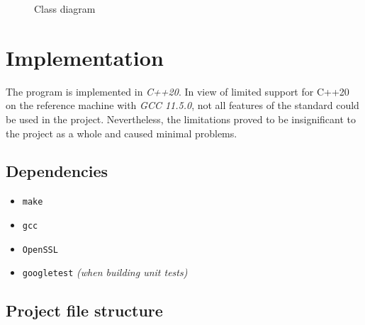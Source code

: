 \documentclass[a4]{report}
\begin{document}
\begin{figure}[t]
  \centering
  \caption{Class diagram}
  \label{class}
\end{figure}


\chapter{Implementation}

The program is implemented in \textit{C++20}. In view of limited support for C++20 on the reference machine with \textit{GCC 11.5.0}, not all features of the standard could be used in the project. Nevertheless, the limitations proved to be insignificant to the project as a whole and caused minimal problems.

\section{Dependencies}

\begin{itemize}
\item \texttt{make}
\item \texttt{gcc}
\item \texttt{OpenSSL}
\item \texttt{googletest} \textit{(when building unit tests)}
\end{itemize}


\section{Project file structure}
\end{document}
